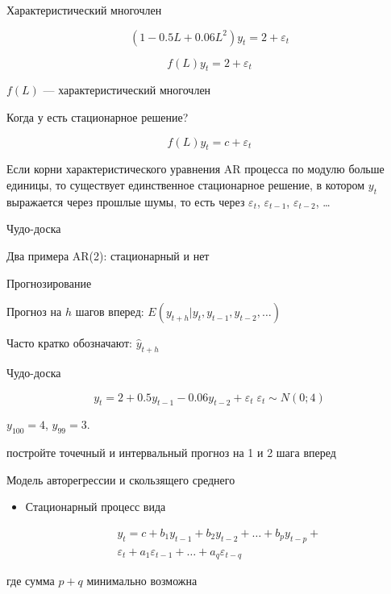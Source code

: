 \documentclass[ignorenonframetext,]{beamer}
\begin{document}
\begin{frame}{Характеристический многочлен}

\[
(1-0.5L+0.06L^2)y_t=2+\varepsilon_t
\]

\[
f(L)y_t=2+\varepsilon_t
\]

$f(L)$ --- характеристический многочлен

\end{frame}

\begin{frame}{Когда у есть стационарное решение?}

\[
f(L)y_t=c+\varepsilon_t
\]

Если корни характеристического уравнения AR процесса по модулю больше
единицы, то существует единственное стационарное решение, в котором
$y_t$ выражается через прошлые шумы, то есть через $\varepsilon_t$,
$\varepsilon_{t-1}$, $\varepsilon_{t-2}$, \ldots

\end{frame}

\begin{frame}{Чудо-доска}

Два примера AR(2): стационарный и нет

\end{frame}

\begin{frame}{Прогнозирование}

Прогноз на $h$ шагов вперед: $E(y_{t+h}|y_t, y_{t-1}, y_{t-2}, \ldots)$

Часто кратко обозначают: $\hat{y}_{t+h}$

\end{frame}

\begin{frame}{Чудо-доска}

\[
y_t=2+0.5y_{t-1}-0.06y_{t-2}+\varepsilon_t \; \varepsilon_t \sim N(0;4)
\]

$y_{100}=4$, $y_{99}=3$.

постройте точечный и интервальный прогноз на 1 и 2 шага вперед

\end{frame}

\begin{frame}{Модель авторегрессии и скользящего среднего}

\begin{itemize}
\itemsep1pt\parskip0pt
\item
  Стационарный процесс вида

  \begin{multline}
  \nonumber
  y_t=c + b_1 y_{t-1} + b_2 y_{t-2} + \ldots + b_p y_{t-p} + \\
  \varepsilon_t + a_1 \varepsilon_{t-1} + \ldots + a_q \varepsilon_{t-q}
  \end{multline}
\end{itemize}

где сумма $p+q$ минимально возможна

\end{frame}
\end{document}
